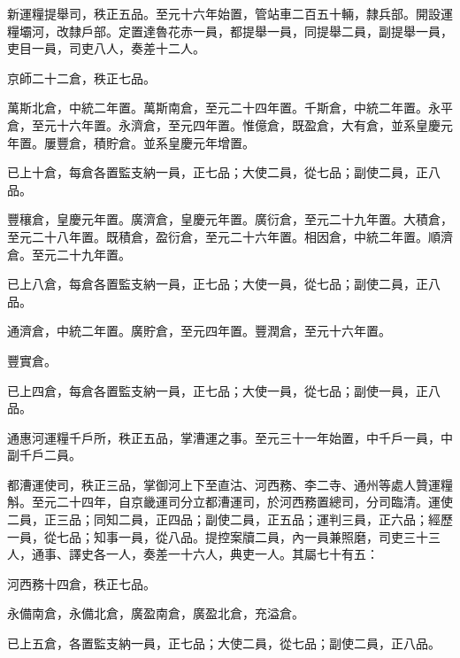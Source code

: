 \begin{pinyinscope}
 新運糧提舉司，秩正五品。至元十六年始置，管站車二百五十輛，隸兵部。開設運糧壩河，改隸戶部。定置達魯花赤一員，都提舉一員，同提舉二員，副提舉一員，吏目一員，司吏八人，奏差十二人。



 京師二十二倉，秩正七品。



 萬斯北倉，中統二年置。萬斯南倉，至元二十四年置。千斯倉，中統二年置。永平倉，至元十六年置。永濟倉，至元四年置。惟億倉，既盈倉，大有倉，並系皇慶元年置。屢豐倉，積貯倉。並系皇慶元年增置。



 已上十倉，每倉各置監支納一員，正七品；大使二員，從七品；副使二員，正八品。



 豐穰倉，皇慶元年置。廣濟倉，皇慶元年置。廣衍倉，至元二十九年置。大積倉，至元二十八年置。既積倉，盈衍倉，至元二十六年置。相因倉，中統二年置。順濟倉。至元二十九年置。



 已上八倉，每倉各置監支納一員，正七品；大使一員，從七品；副使二員，正八品。



 通濟倉，中統二年置。廣貯倉，至元四年置。豐潤倉，至元十六年置。



 豐實倉。



 已上四倉，每倉各置監支納一員，正七品；大使一員，從七品；副使一員，正八品。



 通惠河運糧千戶所，秩正五品，掌漕運之事。至元三十一年始置，中千戶一員，中副千戶二員。



 都漕運使司，秩正三品，掌御河上下至直沽、河西務、李二寺、通州等處人贊運糧斛。至元二十四年，自京畿運司分立都漕運司，於河西務置總司，分司臨清。運使二員，正三品；同知二員，正四品；副使二員，正五品；運判三員，正六品；經歷一員，從七品；知事一員，從八品。提控案牘二員，內一員兼照磨，司吏三十三人，通事、譯史各一人，奏差一十六人，典吏一人。其屬七十有五：



 河西務十四倉，秩正七品。



 永備南倉，永備北倉，廣盈南倉，廣盈北倉，充溢倉。



 已上五倉，各置監支納一員，正七品；大使二員，從七品；副使二員，正八品。




\end{pinyinscope}

